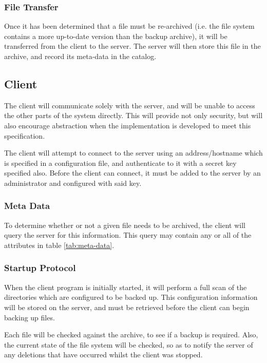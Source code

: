 \subsubsection{File Transfer}

Once it has been determined that a file must be re-archived (i.e. the file
system contains a more up-to-date version than the backup archive), it will be
transferred from the client to the server. The server will then store this file
in the archive, and record its meta-data in the catalog.

\subsection{Client}

The client will communicate solely with the server, and will be unable to
access the other parts of the system directly. This will provide not only
security, but will also encourage abstraction when the implementation is
developed to meet this specification.

The client will attempt to connect to the server using an address/hostname
which is specified in a configuration file, and authenticate to it with
a secret key specified also. Before the client can connect, it must be added to
the server by an administrator and configured with said key.

\subsubsection{Meta Data}

To determine whether or not a given file needs to be archived, the client will
query the server for this information. This query may contain any or all of the
attributes in table \ref{tab:meta-data}.

\subsubsection{Startup Protocol}

When the client program is initially started, it will perform a full scan of
the directories which are configured to be backed up. This configuration
information will be stored on the server, and must be retrieved before the
client can begin backing up files.

Each file will be checked against the archive, to see if a backup is required.
Also, the current state of the file system will be checked, so as to notify the
server of any deletions that have occurred whilst the client was stopped.

